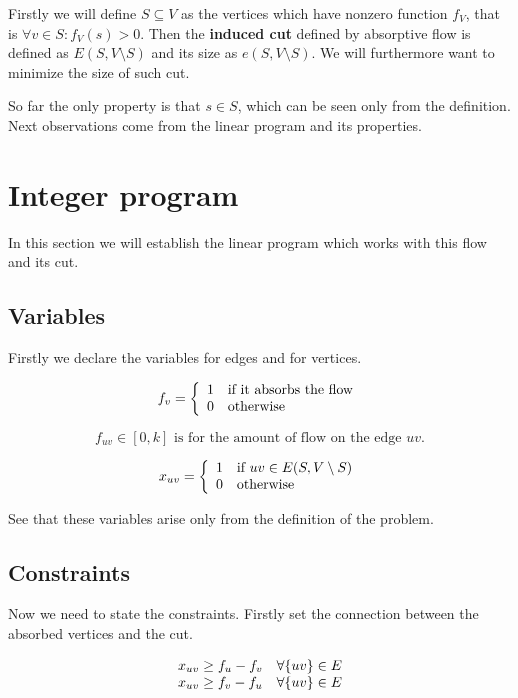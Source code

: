 \documentclass{article}
\theoremstyle{plain}
\theoremstyle{plain}
\theoremstyle{remark}
\begin{document}
	Firstly we will define $S \subseteq V$ as the vertices which have nonzero function $f_V$, that is $\forall v \in S : f_V(s) > 0$. Then the \textbf{induced cut} defined by absorptive flow is defined as $E(S, V \setminus S)$ and its size as $e(S, V \setminus S)$. We will furthermore want to minimize the size of such cut.
	
	So far the only property is that $s \in S$, which can be seen only from the definition. Next observations come from the linear program and its properties.
	
	
	\section{Integer program}
	
	In this section we will establish the linear program which works with this flow and its cut.
	
	\subsection{Variables}
	
	Firstly we declare the variables for edges and for vertices.
	
	$$
	f_v = \left\{\begin{array}{l l}
		1 & \text{if it absorbs the flow} \\
		0 & \text{otherwise}
	\end{array}
	\right.
	$$
	
	$$
	f_{uv} \in [0,k] \text{ is for the amount of flow on the edge } uv.
	$$
	
	$$
	x_{uv} = \left\{\begin{array}{l l}
		1 & \text{if } uv \in E(S, V \setminus S)\\
		0 & \text{otherwise}
	\end{array}
	\right.
	$$
	
	See that these variables arise only from the definition of the problem.
	
	\subsection{Constraints}
	
	Now we need to state the constraints. Firstly set the connection between the absorbed vertices and the cut.
	
	$$
	\begin{array}{r l}
		x_{uv} \geq f_u - f_v & \forall \{uv\} \in E\\
		x_{uv} \geq f_v - f_u & \forall \{uv\} \in E
	\end{array}
	$$
	
\end{document}
